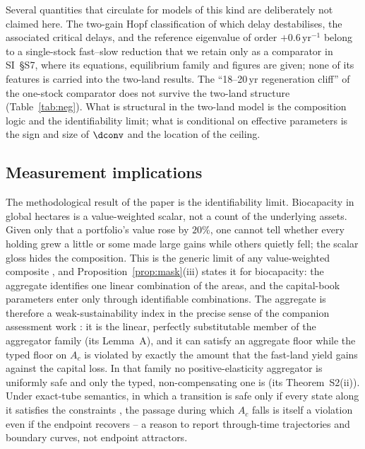 Several quantities that circulate for models of this kind are deliberately not claimed here. The two-gain Hopf classification of which delay destabilises, the associated critical delays, and the reference eigenvalue of order $+0.6\,\mathrm{yr}^{-1}$ belong to a single-stock fast--slow reduction that we retain only as a comparator in SI~\S S7, where its equations, equilibrium family and figures are given; none of its features is carried into the two-land results. The ``18--20\,yr regeneration cliff'' of the one-stock comparator does not survive the two-land structure (Table~\ref{tab:neg}). What is structural in the two-land model is the composition logic and the identifiability limit; what is conditional on effective parameters is the sign and size of $\dconv$ and the location of the ceiling.

\subsection{Measurement implications}

The methodological result of the paper is the identifiability limit. Biocapacity in global hectares is a value-weighted scalar, not a count of the underlying assets. Given only that a portfolio's value rose by $20\%$, one cannot tell whether every holding grew a little or some made large gains while others quietly fell; the scalar gloss hides the composition. This is the generic limit of any value-weighted composite \citep{Nardo2008}, and Proposition~\ref{prop:mask}(iii) states it for biocapacity: the aggregate identifies one linear combination of the areas, and the capital-book parameters enter only through identifiable combinations. The aggregate is therefore a weak-sustainability index in the precise sense of the companion assessment work \citep{Abaee2026b}: it is the linear, perfectly substitutable member of the aggregator family (its Lemma~A), and it can satisfy an aggregate floor while the typed floor on $A_c$ is violated by exactly the amount that the fast-land yield gains against the capital loss. In that family no positive-elasticity aggregator is uniformly safe and only the typed, non-compensating one is (its Theorem~S2(ii)). Under exact-tube semantics, in which a transition is safe only if every state along it satisfies the constraints \citep{Abaee2026b}, the passage during which $A_c$ falls is itself a violation even if the endpoint recovers -- a reason to report through-time trajectories and boundary curves, not endpoint attractors.

